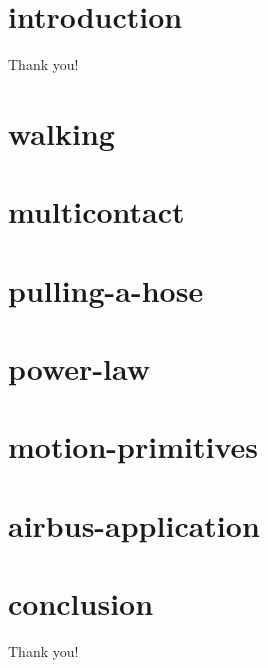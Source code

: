 \documentclass{beamer}
\begin{document}
\begin{frame}{}
  \titlepage
\end{frame}

\section{introduction}
\setcounter{subsection}{1}

\begin{frame}{Thank you!}
\end{frame}

\section{walking}
\setcounter{subsection}{2}

\section{multicontact}
\setcounter{subsection}{3}

\section{pulling-a-hose}
\setcounter{subsection}{4}

\section{power-law}
\setcounter{subsection}{5}

\section{motion-primitives}
\setcounter{subsection}{6}

\section{airbus-application}
\setcounter{subsection}{7}

\section{conclusion}
\setcounter{subsection}{8}

\begin{frame}{Thank you!}
\end{frame}
\end{document}
